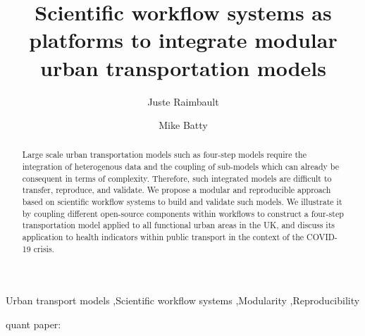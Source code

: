 \documentclass[3p,times,procedia]{elsarticle}
\begin{document}
\begin{frontmatter}


\title{Scientific workflow systems as platforms to integrate modular urban transportation models}

\author[a,b,c]{Juste Raimbault}
\author[a]{Mike Batty}

\address[a]{CASA, University College London, London, United Kingdom}
\address[b]{UPS CNRS 3611 Complex Systems Institute, Paris, France}
\address[c]{UMR CNRS 8504 G{\'e}ographie-cit{\'e}s, Paris, France}

\begin{abstract}
Large scale urban transportation models such as four-step models require the integration of heterogenous data and the coupling of sub-models which can already be consequent in terms of complexity. Therefore, such integrated models are difficult to transfer, reproduce, and validate. We propose a modular and reproducible approach based on scientific workflow systems to build and validate such models. We illustrate it by coupling different open-source components within workflows to construct a four-step transportation model applied to all functional urban areas in the UK, and discuss its application to health indicators within public transport in the context of the COVID-19 crisis.
\end{abstract}

\begin{keyword}
Urban transport models \sep Scientific workflow systems \sep Modularity \sep Reproducibility
\end{keyword}
\end{frontmatter}





\cite{leung2021real}

\cite{chen2021effects}

quant paper: \cite{batty2021new}

\cite{usher2019software}

\cite{horl2021integrating}
\end{document}
